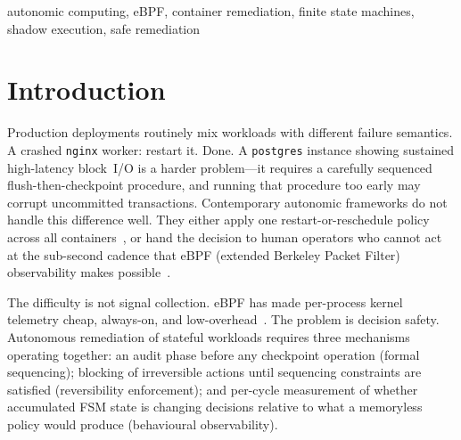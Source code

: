 \documentclass[conference]{IEEEtran}
\begin{document}
\begin{IEEEkeywords}
autonomic computing, eBPF, container remediation, finite state machines, shadow execution, safe remediation
\end{IEEEkeywords}

\section{Introduction}
\label{sec:intro}

Production deployments routinely mix workloads with different failure semantics. A crashed \texttt{nginx} worker: restart it. Done. A \texttt{postgres} instance showing sustained high-latency block~I/O is a harder problem---it requires a carefully sequenced flush-then-checkpoint procedure, and running that procedure too early may corrupt uncommitted transactions. Contemporary autonomic frameworks do not handle this difference well. They either apply one restart-or-reschedule policy across all containers~\cite{b1}, or hand the decision to human operators who cannot act at the sub-second cadence that eBPF (extended Berkeley Packet Filter) observability makes possible~\cite{b6}.

The difficulty is not signal collection. eBPF has made per-process kernel telemetry cheap, always-on, and low-overhead~\cite{b6}. The problem is decision safety. Autonomous remediation of stateful workloads requires three mechanisms operating together: an audit phase before any checkpoint operation (formal sequencing); blocking of irreversible actions until sequencing constraints are satisfied (reversibility enforcement); and per-cycle measurement of whether accumulated FSM state is changing decisions relative to what a memoryless policy would produce (behavioural observability).
\end{document}
